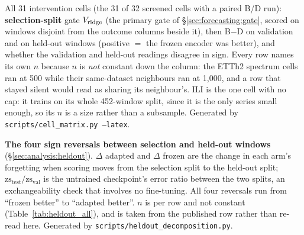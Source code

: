 \begin{table}[ht]
\centering
\caption{All 31 intervention cells (the 31 of 32 screened cells with a paired
B/D run): \textbf{selection-split} gate $\Vb{\text{ridge}}$ (the primary gate of
\S\ref{sec:forecasting:gate}, scored on windows disjoint from the outcome columns
beside it), then
B$-$D on validation and on held-out windows (positive ${=}$ the frozen
encoder was better), and whether the validation and held-out readings
disagree in sign. Every row names its own $n$ because $n$ is \emph{not}
constant down the column: the ETTh2 spectrum cells ran at 500 while their
same-dataset neighbours ran at 1{,}000, and a row that stayed silent would read
as sharing its neighbour's. ILI is the one cell with no cap: it trains on its
whole 452-window split, since it is the only series small enough, so its
$n$ is a size rather than a subsample. Generated by
\texttt{scripts/cell\_matrix.py --latex}.}
\label{tab:heldout_all}

\end{table}


\begin{table}[ht]
\centering
\caption{\textbf{The four sign reversals between selection and held-out
windows} (\S\ref{sec:analysis:heldout}). $\Delta$ adapted and $\Delta$ frozen
are the change in each arm's forgetting when scoring moves from the selection
split to the held-out split; $\text{zs}_\text{test}/\text{zs}_\text{val}$ is
the untrained checkpoint's error ratio between the two splits, an
exchangeability check that involves no fine-tuning. All four reversals run from
``frozen better'' to ``adapted better''. $n$ is per row and not constant
(Table~\ref{tab:heldout_all}), and is taken from the published row rather than
re-read here. Generated by \texttt{scripts/heldout\_decomposition.py}.}
\label{tab:heldout_decomp}

\end{table}

